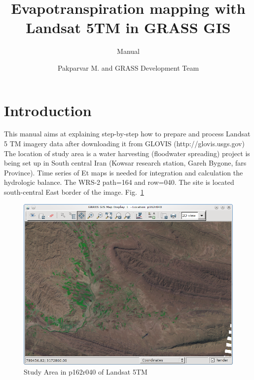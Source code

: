 %


\title{Evapotranspiration mapping with Landsat 5TM in GRASS GIS}
\subtitle{Manual}
\author{Pakparvar M. and GRASS Development Team}

\maketitle
\section{Introduction}

This manual aims at explaining step-by-step how to prepare and process Landsat 5 TM imagery data after downloading it from GLOVIS (http://glovis.usgs.gov) The location of study area is a water harvesting (floodwater spreading) project is being set up in South central Iran (Kowsar research station, Gareh Bygone, fars Province). Time series of Et maps is needed for integration and calculation the hydrologic balance. The WRS-2 path=164 and row=040. The site is located south-central East border of the image. Fig.~\ref{fig:gipe000}\newline

\begin{figure}[htbp]
   \centering
   \includegraphics[scale=0.4]{gipe000.png}
   \caption{Study Area in p162r040 of Landsat 5TM}
   \label{fig:gipe000}
\end{figure}

